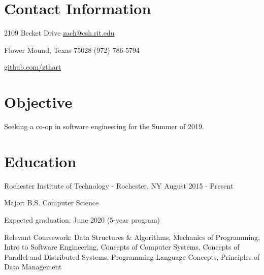 \documentclass[margin,line]{resume}
\newcommand{\rurl}[1]{\hfill {\footnotesize \url{#1}}}
\newcommand{\rdate}[1]{\hfill {\small #1}}
\begin{document}
\begin{resume}
\section{\mysidestyle Contact Information} 
	\begin{asparablank}
		\item 2109 Becket Drive  \hfill \href{mailto:zach@csh.rit.edu}{zach@csh.rit.edu}
		\item Flower Mound, Texas 75028 \hfill (972) 786-5794
		\item \hfill \rurl{github.com/zthart}
    \end{asparablank}

\section{\mysidestyle Objective}
	\begin{asparablank}
    	\item Seeking a co-op in software engineering for the Summer of 2019.
        \normalsize
        \\
	\end{asparablank}

\section{\mysidestyle Education}
	\begin{compactdesc}
		\item[Rochester Institute of Technology] - Rochester, NY \rdate{August 2015 - Present}
		\begin{compactitem} { \small
			\item Major: B.S. Computer Science
			\item Expected graduation: June 2020 (5-year program)
            \item Relevant Coursework: Data Structures \& Algorithms, Mechanics of Programming, Intro to Software Engineering, Concepts of Computer Systems, Concepts of Parallel and Distributed Systems, Programming Language Concepts, Principles of Data Management
		} \end{compactitem}
	\end{compactdesc}


\end{resume}
\end{document}

